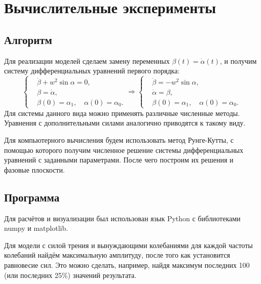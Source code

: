 \section{Вычислительные эксперименты}

    \subsection{Алгоритм}
        Для реализации моделей сделаем замену переменных \( \beta(t) = \dot{\alpha}(t) \), и получим систему дифференциальных уравнений первого порядка:
        \[
            \begin{cases}
                & \dot{\beta} + w^2 \sin \alpha = 0, \\
                & \beta = \dot{\alpha}, \\
                & \beta(0) = \alpha_1, \quad \alpha(0) = \alpha_0.
            \end{cases} \Rightarrow
            \begin{cases}
                & \dot{\beta} = - w^2 \sin \alpha, \\
                & \dot{\alpha} = \beta, \\
                & \beta(0) = \alpha_1, \quad \alpha(0) = \alpha_0.
            \end{cases}
        \]
        Для системы данного вида можно применять различные численные методы. Уравнения с дополнительными силами аналогично приводятся к такому виду.

        Для компьютерного вычисления будем использовать метод Рунге-Кутты, с помощью которого получим численное решение системы дифференциальных уравнений с заданными параметрами. После чего построим их решения и фазовые плоскости.



    \subsection{Программа}
        Для расчётов и визуализации был использован язык Python с библиотеками numpy и matplotlib.

        

        Для модели с силой трения и вынуждающими колебаниями для каждой частоты колебаний найдём максимальную амплитуду, после того как установится равновесие сил. Это можно сделать, например, найдя максимум последних 100 (или последних 25\%) значений результата.

